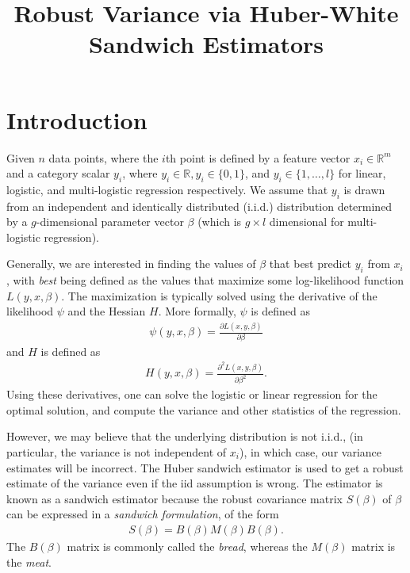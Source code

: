 \documentclass[12pt]{article}
\title{Robust Variance via Huber-White Sandwich Estimators}
\begin{document}
\maketitle

\section{Introduction}
Given  $n$ data points, where the $i$th point is defined by a feature  vector $x_i \in \mathbb{R}^m$ and a category scalar $y_i$, where $y_i \in \mathbb{R}, y_i \in \{0,1 \}$, and $y_i \in \{1,\dots, l \}$ for linear, logistic, and multi-logistic regression respectively.  We assume that $y_i$ is drawn from an independent and identically distributed (i.i.d.) distribution determined by a $g$-dimensional parameter vector $\beta$ (which is $g\times l$ dimensional for multi-logistic regression).  

Generally, we are interested in finding the values of $\beta$ that best predict $y_i$ from $x_i$, with \textit{best} being defined as the values that maximize some log-likelihood function $L(y,x,\beta)$.  The maximization is typically solved using the derivative of the likelihood $\psi$  and the Hessian $H$.  More formally, $\psi$ is defined as 
\begin{align}
\psi(y,x, \beta) = \frac{\partial L(x,y,\beta)}{\partial \beta}
\end{align} 
and $H$ is defined as
\begin{align}
H(y,x, \beta) = \frac{\partial^2 L(x,y,\beta)}{\partial \beta^2}.
\end{align} 
Using these derivatives, one can solve the logistic or linear regression for the optimal solution, and compute the variance and other statistics of the regression.  


However, we may believe that the underlying distribution is not i.i.d., (in particular, the variance is not independent of $x_i$), in which case, our variance estimates will be incorrect. 
 The Huber sandwich estimator is used to get a robust estimate of the variance even if the iid assumption is wrong.  The estimator is known as a sandwich estimator because the robust covariance matrix $S(\beta)$ of $\beta$ can be expressed in a \textit{sandwich formulation}, of the form
\begin{align}
S(\beta) = B(\beta) M(\beta) B(\beta).  
\end{align}
The $B(\beta)$ matrix is commonly called the \textit{bread}, whereas the $M(\beta)$ matrix is the \textit{meat}.  
\end{document}
